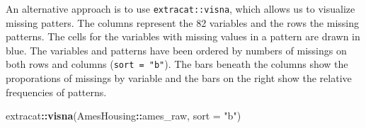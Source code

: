 \documentclass[]{article}
\newenvironment{Shaded}{\begin{snugshade}}{\end{snugshade}}
\newcommand{\KeywordTok}[1]{\textcolor[rgb]{0.13,0.29,0.53}{\textbf{#1}}}
\newcommand{\DataTypeTok}[1]{\textcolor[rgb]{0.13,0.29,0.53}{#1}}
\newcommand{\StringTok}[1]{\textcolor[rgb]{0.31,0.60,0.02}{#1}}
\newcommand{\OperatorTok}[1]{\textcolor[rgb]{0.81,0.36,0.00}{\textbf{#1}}}
\newcommand{\NormalTok}[1]{#1}
\begin{document}
\begin{Shaded}
\end{Shaded}

An alternative approach is to use \texttt{extracat::visna}, which allows
us to visualize missing patters. The columns represent the 82 variables
and the rows the missing patterns. The cells for the variables with
missing values in a pattern are drawn in blue. The variables and
patterns have been ordered by numbers of missings on both rows and
columns (\texttt{sort\ =\ "b"}). The bars beneath the columns show the
proporations of missings by variable and the bars on the right show the
relative frequencies of patterns.

\begin{Shaded}
\begin{Highlighting}[]
\NormalTok{extracat}\OperatorTok{::}\KeywordTok{visna}\NormalTok{(AmesHousing}\OperatorTok{::}\NormalTok{ames_raw, }\DataTypeTok{sort =} \StringTok{"b"}\NormalTok{)}
\end{Highlighting}
\end{Shaded}
\end{document}

